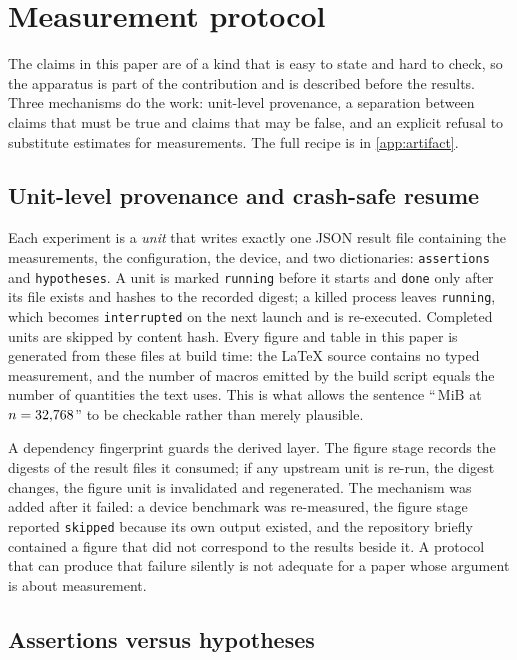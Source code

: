 \section{Measurement protocol}\label{sec:protocol}

The claims in this paper are of a kind that is easy to state and hard to check, so
the apparatus is part of the contribution and is described before the results.
Three mechanisms do the work: unit-level provenance, a separation between claims
that must be true and claims that may be false, and an explicit refusal to
substitute estimates for measurements. The full recipe is in
\ref{app:artifact}.

\subsection{Unit-level provenance and crash-safe resume}

Each experiment is a \emph{unit} that writes exactly one JSON result file
containing the measurements, the configuration, the device, and two dictionaries:
\texttt{assertions} and \texttt{hypotheses}. A unit is marked \texttt{running}
before it starts and \texttt{done} only after its file exists and hashes to the
recorded digest; a killed process leaves \texttt{running}, which becomes
\texttt{interrupted} on the next launch and is re-executed. Completed units are
skipped by content hash. Every figure and table in this paper is generated from
these files at build time: the LaTeX source contains no typed measurement, and
the number of macros emitted by the build script equals the number of quantities
the text uses. This is what allows the sentence ``\VramPswaBig\,MiB at
$n=32{,}768$'' to be checkable rather than merely plausible.

A dependency fingerprint guards the derived layer. The figure stage records the
digests of the result files it consumed; if any upstream unit is re-run, the
digest changes, the figure unit is invalidated and regenerated. The mechanism was
added after it failed: a device benchmark was re-measured, the figure stage
reported \texttt{skipped} because its own output existed, and the repository
briefly contained a figure that did not correspond to the results beside it. A
protocol that can produce that failure silently is not adequate for a paper whose
argument is about measurement.

\subsection{Assertions versus hypotheses}\label{sec:audit}


